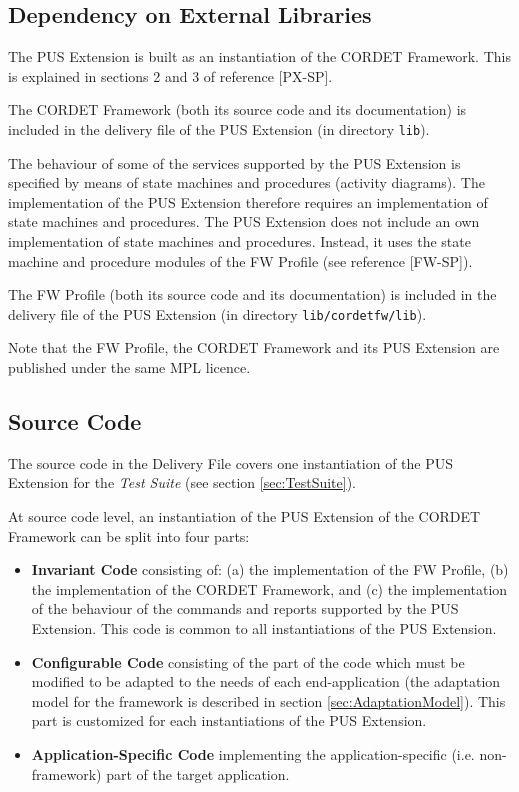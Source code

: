 \documentclass{pnp_article}
\begin{document}
\subsection{Dependency on External Libraries}\label{sec:depLib}
The PUS Extension is built as an instantiation of the CORDET Framework. This is explained in sections 2 and 3 of reference [PX-SP].

The CORDET Framework (both its source code and its documentation) is included in the delivery file of the PUS Extension (in directory \texttt{lib}). 

The behaviour of some of the services supported by the PUS Extension is specified by means of state machines and procedures (activity diagrams). The implementation of the PUS Extension therefore requires an implementation of state machines and procedures. The PUS Extension does not include an own implementation of state machines and procedures. Instead, it uses the state machine and procedure modules of the FW Profile (see reference [FW-SP]). 

The FW Profile (both its source code and its documentation) is included in the delivery file of the PUS Extension (in directory \texttt{lib/cordetfw/lib}). 

Note that the FW Profile, the CORDET Framework and its PUS Extension are published under the same MPL licence. 

\subsection{Source Code}\label{sec:fwSrcCode}
The source code in the Delivery File covers one instantiation of the PUS Extension for the \textit{Test Suite} (see section \ref{sec:TestSuite}). 

At source code level, an instantiation of the PUS Extension of the CORDET Framework can be split into four parts:

\begin{itemize}
\item \textbf{Invariant Code} consisting of: (a) the implementation of the FW Profile, (b) the implementation of the CORDET Framework, and (c)  the implementation of the behaviour of the commands and reports supported by the PUS Extension. This code is common to all instantiations of the PUS Extension. 
\item \textbf{Configurable Code} consisting of the part of the code which must be modified to be adapted to the needs of each end-application (the adaptation model for the framework is described in section \ref{sec:AdaptationModel}). This part is customized for each instantiations of the PUS Extension. 
\item \textbf{Application-Specific Code} implementing the application-specific (i.e. non-framework) part of the target application. 
\end{itemize}
\end{document}
